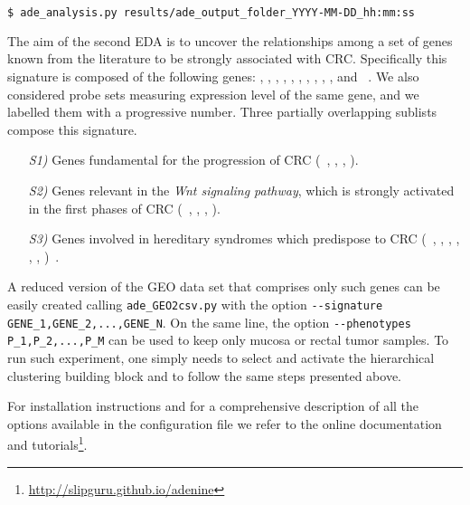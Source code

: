 {\footnotesize
\begin{lstlisting}[language=bash,caption={ }]
  $ ade_analysis.py results/ade_output_folder_YYYY-MM-DD_hh:mm:ss
\end{lstlisting}
}


The aim of the second EDA is to uncover the relationships among a set of genes known from the literature to be strongly associated with CRC. Specifically this signature is composed of the following genes: \apc, \kras, \ctnnb, \tp, \msh, \mlh, \pms, \pten, \smad, \stk, \gsk and \axin~\cite{schulz2005molecular}.
We also considered probe sets measuring expression level of the same gene, and we labelled them with a progressive number.
Three partially overlapping sublists compose this signature.
\begin{enumerate}
  \item[\emph{S1)}] Genes fundamental for the progression of CRC (\ie~\apc, \kras, \ctnnb, \tp).
  \item[\emph{S2)}] Genes relevant in the \textit{Wnt signaling pathway}, which is strongly activated in the first phases of CRC (\ie~\apc, \ctnnb, \gsk, \axin).
  \item[\emph{S3)}] Genes involved in hereditary syndromes which predispose to CRC (\ie~\apc, \msh, \mlh, \pms, \pten, \smad, \stk)~\cite{schulz2005molecular}.
\end{enumerate}

A reduced version of the GEO data set that comprises only such genes can be easily created calling \texttt{{\footnotesize ade\_GEO2csv.py}} with the option \texttt{{\footnotesize -{}-signature GENE\_1,GENE\_2,...,GENE\_N}}. On the same line, the option \texttt{{\footnotesize -{}-phenotypes P\_1,P\_2,...,P\_M}} can be used to keep only mucosa or rectal tumor samples.
To run such experiment, one simply needs to select and activate the hierarchical clustering building block and to follow the same steps presented above.


For \ade installation instructions and for a comprehensive description of all the options available in the configuration file we refer to the online documentation and tutorials\footnote{\url{http://slipguru.github.io/adenine}}.

